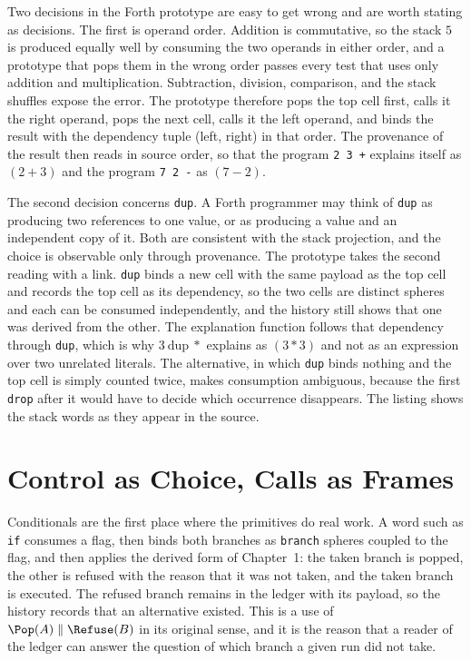 Two decisions in the Forth prototype are easy to get wrong and are worth stating as decisions. The first is operand order. Addition is commutative, so the stack $5$ is produced equally well by consuming the two operands in either order, and a prototype that pops them in the wrong order passes every test that uses only addition and multiplication. Subtraction, division, comparison, and the stack shuffles expose the error. The prototype therefore pops the top cell first, calls it the right operand, pops the next cell, calls it the left operand, and binds the result with the dependency tuple (left, right) in that order. The provenance of the result then reads in source order, so that the program \texttt{2 3 +} explains itself as $(2 + 3)$ and the program \texttt{7 2 -} as $(7 - 2)$.


The second decision concerns \texttt{dup}. A Forth programmer may think of \texttt{dup} as producing two references to one value, or as producing a value and an independent copy of it. Both are consistent with the stack projection, and the choice is observable only through provenance. The prototype takes the second reading with a link. \texttt{dup} binds a new cell with the same payload as the top cell and records the top cell as its dependency, so the two cells are distinct spheres and each can be consumed independently, and the history still shows that one was derived from the other. The explanation function follows that dependency through \texttt{dup}, which is why $3\ \mathrm{dup}\ {*}$ explains as $(3 * 3)$ and not as an expression over two unrelated literals. The alternative, in which \texttt{dup} binds nothing and the top cell is simply counted twice, makes consumption ambiguous, because the first \texttt{drop} after it would have to decide which occurrence disappears. The listing shows the stack words as they appear in the source.


\section{Control as Choice, Calls as Frames}

Conditionals are the first place where the primitives do real work. A word such as \texttt{if} consumes a flag, then binds both branches as \texttt{branch} spheres coupled to the flag, and then applies the derived form of Chapter~1: the taken branch is popped, the other is refused with the reason that it was not taken, and the taken branch is executed. The refused branch remains in the ledger with its payload, so the history records that an alternative existed. This is a use of $\Pop(A)\parallel\Refuse(B)$ in its original sense, and it is the reason that a reader of the ledger can answer the question of which branch a given run did not take.

